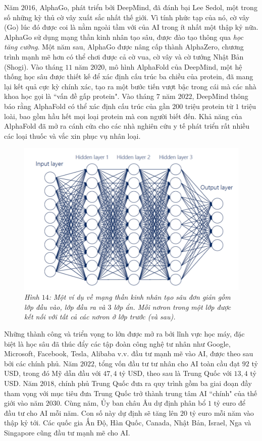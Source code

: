 \begin{multicols}{2}
	\vskip 0.1cm
	Năm $2016$, AlphaGo, phát triển bởi DeepMind, đã đánh bại Lee Sedol, một trong số những kỳ thủ cờ vây xuất sắc nhất thế giới. Vì tính phức tạp của nó, cờ vây (Go) lúc đó được coi là nằm ngoài tầm với của AI trong ít nhất một thập kỷ nữa. AlphaGo sử dụng mạng thần kinh nhân tạo sâu, được đào tạo thông qua \textit{học tăng cường}. Một năm sau, AlphaGo được nâng cấp thành AlphaZero, chương trình mạnh mẽ hơn có thể chơi được cả cờ vua, cờ vây và cờ tướng Nhật Bản (Shogi).
	\vskip 0.1cm
	Vào tháng $11$ năm $2020$, mô hình AlphaFold của DeepMind, một hệ thống học sâu được thiết kế để xác định cấu trúc ba chiều của protein, đã mang lại kết quả cực kỳ chính xác, tạo ra một bước tiến vượt bậc trong cái mà các nhà khoa học gọi là ``vấn đề gấp protein". Vào tháng $7$ năm $2022$, DeepMind thông báo rằng AlphaFold có thể xác định cấu trúc của gần $200$ triệu protein từ $1$ triệu loài, bao gồm hầu hết mọi loại protein mà con người biết đến. Khả năng của AlphaFold đã mở ra cánh cửa cho các nhà nghiên cứu y tế phát triển rất nhiều các loại thuốc và vắc xin phục vụ nhân loại.
	\begin{figure}[H]
		\vspace*{-5pt}
		\centering
		\captionsetup{labelformat= empty, justification=centering}
		\includegraphics[width= 1\linewidth]{Deep-Neural-Network.png}
		\caption{\small\textit{\color{timhieukhoahoc}Hình $14$: Một ví dụ về mạng thần kinh nhân tạo sâu đơn giản gồm lớp đầu vào, lớp đầu ra và $3$ lớp ẩn. Mỗi nơron trong một lớp được kết nối với tất cả các nơron ở lớp trước (và sau).}}
		\vspace*{-10pt}
	\end{figure}
	Những thành công và triển vọng to lớn được mở ra bởi lĩnh vực học máy, đặc biệt là học sâu đã thúc đẩy các tập đoàn công nghệ tư nhân như Google, Microsoft, Facebook, Tesla, Alibaba v.v. đầu tư mạnh mẽ vào AI, được theo sau bởi các chính phủ. Năm $2022$, tổng vốn đầu tư tư nhân cho AI toàn cầu đạt $92$ tỷ USD, trong đó Mỹ dẫn đầu với $47{,}4$ tỷ USD, theo sau là Trung Quốc với $13{,}4$ tỷ USD. Năm $2018$, chính phủ Trung Quốc đưa ra quy trình gồm ba giai đoạn đầy tham vọng với mục tiêu đưa Trung Quốc trở thành trung tâm AI ``chính" của thế giới vào năm $2030$. Cùng năm, Ủy ban châu Âu dự định phân bổ $1$ tỷ euro để đầu tư cho AI mỗi năm. Con số này dự định sẽ tăng lên $20$ tỷ euro mỗi năm vào thập kỷ tới. Các quốc gia Ấn Độ, Hàn Quốc, Canada, Nhật Bản, Israel, Nga và Singapore cũng đầu tư mạnh mẽ cho AI.

\end{multicols}
